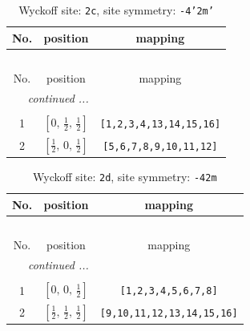 \documentclass[fleqn,8pt]{jsarticle}
\begin{document}
\renewcommand{\arraystretch}{1.2}
\begin{longtable}{ccc}
\caption{Wyckoff site: {\tt 2c}, site symmetry: {\tt -4'2m'}}
 \\
 \hline \hline
No. & position & mapping \\ \hline \endfirsthead

\multicolumn{2}{l}{\tablename\ \thetable{}} \\
 \hline \hline
No. & position & mapping \\ \hline \endhead

 \hline \hline
\multicolumn{2}{r}{\footnotesize\it continued ...} \\ \endfoot

 \hline \hline
\multicolumn{2}{r}{} \\ \endlastfoot

1 & $\left[ 0,\, \frac{1}{2},\, \frac{1}{2} \right]$ & {\tt [1,2,3,4,13,14,15,16]} \\ \hline
2 & $\left[ \frac{1}{2},\, 0,\, \frac{1}{2} \right]$ & {\tt [5,6,7,8,9,10,11,12]} \\
\end{longtable}
\renewcommand{\arraystretch}{1.2}
\begin{longtable}{ccc}
\caption{Wyckoff site: {\tt 2d}, site symmetry: {\tt -42m}}
 \\
 \hline \hline
No. & position & mapping \\ \hline \endfirsthead

\multicolumn{2}{l}{\tablename\ \thetable{}} \\
 \hline \hline
No. & position & mapping \\ \hline \endhead

 \hline \hline
\multicolumn{2}{r}{\footnotesize\it continued ...} \\ \endfoot

 \hline \hline
\multicolumn{2}{r}{} \\ \endlastfoot

1 & $\left[ 0,\, 0,\, \frac{1}{2} \right]$ & {\tt [1,2,3,4,5,6,7,8]} \\ \hline
2 & $\left[ \frac{1}{2},\, \frac{1}{2},\, \frac{1}{2} \right]$ & {\tt [9,10,11,12,13,14,15,16]} \\
\end{longtable}
\renewcommand{\arraystretch}{1.2}
\end{document}
